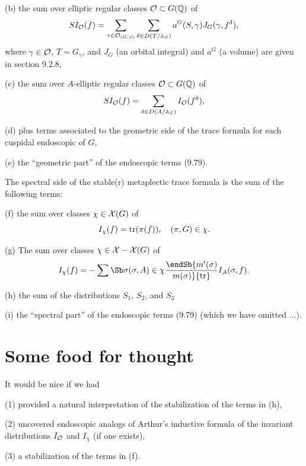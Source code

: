 (b) the sum over elliptic regular classes 
${\cal{O}}\subset G({\Bbb{Q}})$
of
\begin{equation}
SI_{\cal{O}}(f)=
\sum_{\gamma\in {\cal{O}}_{(G,S)}}
\sum_{\delta\in D(T/{\Bbb{A}}_S)}
a^G(S,\gamma)J_G(\gamma,f^\delta),
\end{equation}
where $\gamma\in {\cal{O}}$, $T=G_\gamma$, and
$J_G$ (an orbital integral) and $a^G$ (a volume)
are given in section 9.2.8,

(c)  the sum over $A$-elliptic regular classes
${\cal{O}}\subset G({\Bbb{Q}})$
of
\begin{equation}
SI_{\cal{O}}(f)=
\sum_{\delta\in D(A/{\Bbb{A}}_S)}
I_{\cal{O}}(f^\delta),
\end{equation}

(d) plus terms associated to the geometric side of the 
trace formula for each cuspidal endoscopic of $G$,

(e) the ``geometric part'' of the endoscopic terms (9.79).

The spectral side of the stable(r) metaplectic
trace formula is the sum of the following terms:

(f) the sum over classes $\chi\in {\cal{X}}(G)$ of
\begin{equation}
I_\chi(f)=
{\rm tr}(\pi(f)),\ \ \ (\pi,G)\in\chi.
\end{equation}

(g) The sum over classes $\chi\in {\cal{X}}-{\cal{X}}(G)$
of
\begin{equation}
I_\chi(f)=-\sum\Sb \sigma\\
(\sigma,A)\in\chi\endSb
{m'(\sigma)\over m(\sigma)}
{\rm tr}I_A(\sigma,f).
\end{equation}

(h) the sum of the distributions $S_1$, $S_2$, and $S_3$

(i) the ``spectral part'' of the endoscopic terms (9.79)
(which we have omitted ...).

\section{Some food for thought}

It would be nice if we had

(1) provided a natural interpretation of the
stabilization of the terms in (h),

(2) uncovered endoscopic analogs of Arthur's
inductive formula of the invariant
distributions $I_{\cal{O}}$ and $I_\chi$ (if one exists),

(3) a stabilization of the terms in (f).



